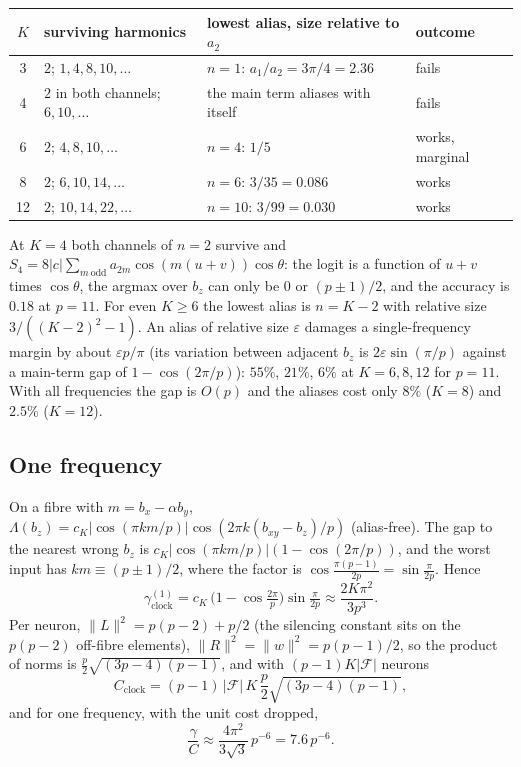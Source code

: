 \documentclass[11pt]{article}
\theoremstyle{remark}
\newcommand{\cost}{C}
\newcommand{\gam}{\gamma}
\newcommand{\abs}[1]{\lvert #1 \rvert}
\newcommand{\norm}[1]{\lVert #1 \rVert}
\begin{document}
\begin{table}[h]\centering
\begin{tabular}{c l l l}
\toprule
$K$ & surviving harmonics & lowest alias, size relative to $a_2$ & outcome \\
\midrule
3  & $2$; $1, 4, 8, 10, \dots$ & $n=1$: $a_1/a_2 = 3\pi/4 = 2.36$ & fails \\
4  & $2$ in both channels; $6, 10, \dots$ & the main term aliases with itself & fails \\
6  & $2$; $4, 8, 10, \dots$ & $n=4$: $1/5$ & works, marginal \\
8  & $2$; $6, 10, 14, \dots$ & $n=6$: $3/35 = 0.086$ & works \\
12 & $2$; $10, 14, 22, \dots$ & $n=10$: $3/99 = 0.030$ & works \\
\bottomrule
\end{tabular}
\end{table}

At $K = 4$ both channels of $n = 2$ survive and $S_4 = 8\abs{c}\sum_{m\ \mathrm{odd}} a_{2m}\cos(m(u+v))\cos\theta$: the logit is a
function of $u+v$ times $\cos\theta$, the argmax over $b_z$ can only be $0$ or $(p \pm 1)/2$, and the accuracy is $0.18$ at $p = 11$.
For even $K \ge 6$ the lowest alias is $n = K - 2$ with relative size $3/((K-2)^2 - 1)$. An alias of relative size $\varepsilon$ damages
a single-frequency margin by about $\varepsilon p / \pi$ (its variation between adjacent $b_z$ is $2\varepsilon\sin(\pi/p)$ against a main-term
gap of $1 - \cos(2\pi/p)$): $55\%$, $21\%$, $6\%$ at $K = 6, 8, 12$ for $p = 11$. With all frequencies the gap is $O(p)$ and the aliases
cost only $8\%$ ($K=8$) and $2.5\%$ ($K=12$).

\subsection{One frequency}

On a fibre with $m = b_x - \alpha b_y$, $\Lambda(b_z) = c_K \abs{\cos(\pi k m / p)}\cos(2\pi k(b_{xy} - b_z)/p)$ (alias-free). The gap to the
nearest wrong $b_z$ is $c_K\abs{\cos(\pi k m/p)}(1 - \cos(2\pi/p))$, and the worst input has $km \equiv (p \pm 1)/2$, where the factor is
$\cos\tfrac{\pi(p-1)}{2p} = \sin\tfrac{\pi}{2p}$. Hence
\begin{equation}
\gam_{\mathrm{clock}}^{(1)} = c_K\,\bigl(1 - \cos\tfrac{2\pi}{p}\bigr)\sin\tfrac{\pi}{2p} \approx \frac{2K\pi^2}{3p^3}.
\end{equation}
Per neuron, $\norm{L}^2 = p(p-2) + p/2$ (the silencing constant sits on the $p(p-2)$ off-fibre elements), $\norm{R}^2 = \norm{w}^2 = p(p-1)/2$,
so the product of norms is $\tfrac{p}{2}\sqrt{(3p-4)(p-1)}$, and with $(p-1)K\abs{\mathcal{F}}$ neurons
\begin{equation}
\cost_{\mathrm{clock}} = (p-1)\,\abs{\mathcal{F}}\,K\,\frac{p}{2}\sqrt{(3p-4)(p-1)},
\end{equation}
and for one frequency, with the unit cost dropped,
\begin{equation}
\frac{\gam}{\cost} \approx \frac{4\pi^2}{3\sqrt{3}}\,p^{-6} = 7.6\,p^{-6}.
\end{equation}
\end{document}
